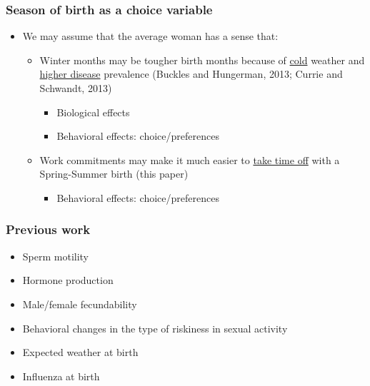 \documentclass[10pt,letterpaper,subeqn]{beamer}
\begin{document}
\begin{frame}
\frametitle{Season of birth as a choice variable}
\begin{itemize}
\item We may assume that the average woman has a sense that:
\begin{itemize}
\item Winter months may be tougher birth months because of \underline{cold} weather and \underline{higher disease} prevalence (Buckles and Hungerman, 2013; Currie and Schwandt, 2013)
\begin{itemize}
\item Biological effects
\item Behavioral effects: choice/preferences
\end{itemize}
\item Work commitments may make it much easier to \underline{take time off} with a Spring-Summer birth (\textcolor[rgb]{1.00,0.00,0.00}{this paper})
\begin{itemize}
\item Behavioral effects: choice/preferences
\end{itemize}
\end{itemize}
\end{itemize}
\end{frame}

\begin{frame}
\frametitle{Previous work}
\begin{itemize}
\item Sperm motility
\item Hormone production
\item Male/female fecundability 
\item Behavioral changes in the type of riskiness in sexual activity
\item Expected weather at birth
\item Influenza at birth
\end{itemize}
\end{frame}
\end{document}
